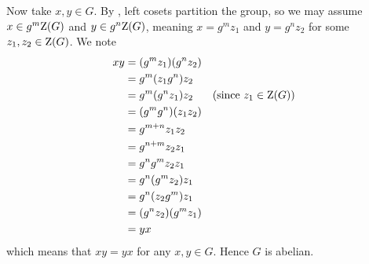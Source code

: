 \begin{enumerate}
    Now take $x, y \in G$. By , left cosets partition the group, so we may assume $x \in g^m\mathrm{Z}(G)$ and $y \in g^n\mathrm{Z}(G)$, meaning $x = g^mz_1$ and $y = g^nz_2$ for some $z_1, z_2 \in \mathrm{Z}(G)$. We note
    \begin{align*}
        xy &= (g^mz_1)(g^nz_2)\\
        &= g^m(z_1g^n)z_2\\
        &= g^m(g^nz_1)z_2 & (\text{since }z_1 \in \mathrm{Z}(G))\\
        &= (g^mg^n)(z_1z_2)\\
        &= g^{m+n}z_1z_2\\
        &= g^{n+m}z_2z_1\\
        &= g^ng^mz_2z_1\\
        &= g^n(g^mz_2)z_1\\
        &= g^n(z_2g^m)z_1\\
        &= (g^nz_2)(g^mz_1)\\
        &= yx
    \end{align*}
    which means that $xy = yx$ for any $x, y \in G$. Hence $G$ is abelian.
\end{enumerate}

